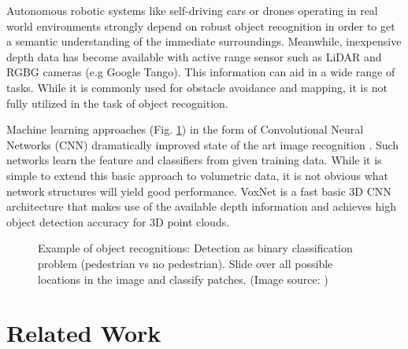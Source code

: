 \documentclass[10pt,twocolumn,letterpaper]{article}
\begin{document}
Autonomous robotic systems like self-driving cars or drones operating in real world environments strongly depend on robust object recognition
in order to get a semantic understanding of the immediate surroundings.
Meanwhile, inexpensive depth data has become available with active range sensor such as LiDAR and RGBG cameras (e.g Google Tango). 
This information can aid in a wide range of tasks. While it is commonly used for obstacle avoidance and mapping, it is not fully 
utilized in the task of object recognition.


Machine learning approaches (Fig. \ref{fig:obj_rec}) in the form of Convolutional Neural Networks (CNN) dramatically improved state 
of the art image recognition \cite{krizhevsky2012imagenet}. Such networks learn the feature and classifiers from given training data.
While it is simple to extend this basic approach to volumetric data, it is not obvious what network structures will yield good performance.
VoxNet \cite{voxnet} is a fast basic 3D CNN architecture that makes use of the available depth information and achieves high object detection accuracy for 
3D point clouds.


\begin{figure}[h]
	\label{fig:obj_rec}
	\centering
	\caption{Example of object recognitions: Detection as binary classification problem (pedestrian vs no pedestrian). Slide over all possible locations in the image and classify patches. 
	  (Image source: \cite{udacity})}
\end{figure}


\section{Related Work}

\end{document}
